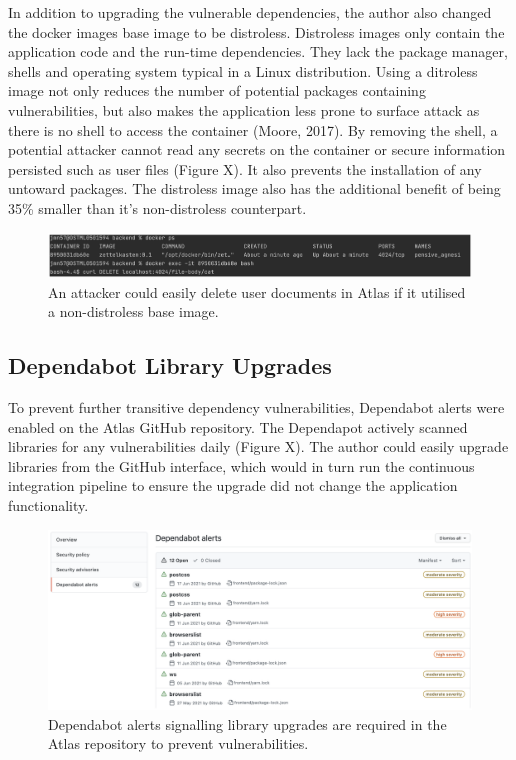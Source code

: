 \documentclass{article}
\begin{document}
In addition to upgrading the vulnerable dependencies, the author also changed the docker images base image to be distroless. Distroless images only contain the application code and the run-time dependencies. They lack the package manager, shells and operating system typical in a Linux distribution. Using a ditroless image not only reduces the number of potential packages containing vulnerabilities, but also makes the application less prone to surface attack as there is no shell to access the container (Moore, 2017). By removing the shell, a potential attacker cannot read any secrets on the container or secure information persisted such as user files (Figure X). It also prevents the installation of any untoward packages. The distroless image also has the additional benefit of being 35\% smaller than it’s non-distroless counterpart.

\begin{figure}[!htb]
  \centering
      \includegraphics[width=1\textwidth]{images/distroless.png}
  \caption{An attacker could easily delete user documents in Atlas if it utilised a non-distroless base image.}
\end{figure}

\subsection{Dependabot Library Upgrades}

To prevent further transitive dependency vulnerabilities, Dependabot alerts were enabled on the Atlas GitHub repository. The Dependapot actively scanned libraries for any vulnerabilities daily (Figure X). The author could easily upgrade libraries from the GitHub interface, which would in turn run the continuous integration pipeline to ensure the upgrade did not change the application functionality. 

\begin{figure}[!htb]
  \centering
      \includegraphics[width=1\textwidth]{images/dependabot.png}
  \caption{Dependabot alerts signalling library upgrades are required in the Atlas repository to prevent vulnerabilities.}
\end{figure}
\end{document}
